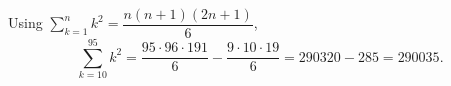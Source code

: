 Using $\displaystyle\sum_{k=1}^{n}k^2=\dfrac{n(n+1)(2n+1)}{6}$,
\[\sum_{k=10}^{95}k^2=\dfrac{95\cdot96\cdot191}{6}-\dfrac{9\cdot10\cdot19}{6}=290320-285=\boxed{290035}.\]

